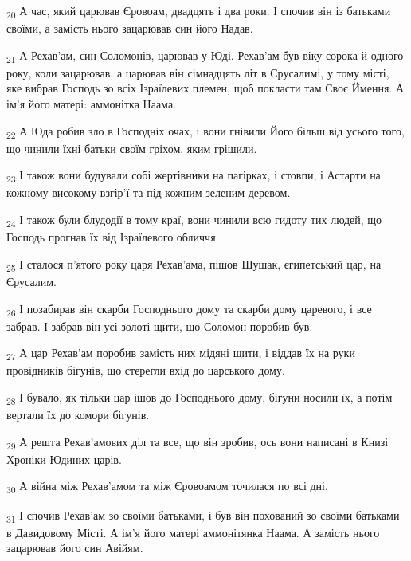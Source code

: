 \begin{tcolorbox}
\textsubscript{20} А час, який царював Єровоам, двадцять і два роки. І спочив він із батьками своїми, а замість нього зацарював син його Надав.
\end{tcolorbox}
\begin{tcolorbox}
\textsubscript{21} А Рехав'ам, син Соломонів, царював у Юді. Рехав'ам був віку сорока й одного року, коли зацарював, а царював він сімнадцять літ в Єрусалимі, у тому місті, яке вибрав Господь зо всіх Ізраїлевих племен, щоб покласти там Своє Ймення. А ім'я його матері: аммонітка Наама.
\end{tcolorbox}
\begin{tcolorbox}
\textsubscript{22} А Юда робив зло в Господніх очах, і вони гнівили Його більш від усього того, що чинили їхні батьки своїм гріхом, яким грішили.
\end{tcolorbox}
\begin{tcolorbox}
\textsubscript{23} І також вони будували собі жертівники на пагірках, і стовпи, і Астарти на кожному високому взгір'ї та під кожним зеленим деревом.
\end{tcolorbox}
\begin{tcolorbox}
\textsubscript{24} І також були блудодії в тому краї, вони чинили всю гидоту тих людей, що Господь прогнав їх від Ізраїлевого обличчя.
\end{tcolorbox}
\begin{tcolorbox}
\textsubscript{25} І сталося п'ятого року царя Рехав'ама, пішов Шушак, єгипетський цар, на Єрусалим.
\end{tcolorbox}
\begin{tcolorbox}
\textsubscript{26} І позабирав він скарби Господнього дому та скарби дому царевого, і все забрав. І забрав він усі золоті щити, що Соломон поробив був.
\end{tcolorbox}
\begin{tcolorbox}
\textsubscript{27} А цар Рехав'ам поробив замість них мідяні щити, і віддав їх на руки провідників бігунів, що стерегли вхід до царського дому.
\end{tcolorbox}
\begin{tcolorbox}
\textsubscript{28} І бувало, як тільки цар ішов до Господнього дому, бігуни носили їх, а потім вертали їх до комори бігунів.
\end{tcolorbox}
\begin{tcolorbox}
\textsubscript{29} А решта Рехав'амових діл та все, що він зробив, ось вони написані в Книзі Хроніки Юдиних царів.
\end{tcolorbox}
\begin{tcolorbox}
\textsubscript{30} А війна між Рехав'амом та між Єровоамом точилася по всі дні.
\end{tcolorbox}
\begin{tcolorbox}
\textsubscript{31} І спочив Рехав'ам зо своїми батьками, і був він похований зо своїми батьками в Давидовому Місті. А ім'я його матері аммонітянка Наама. А замість нього зацарював його син Авійям.
\end{tcolorbox}
